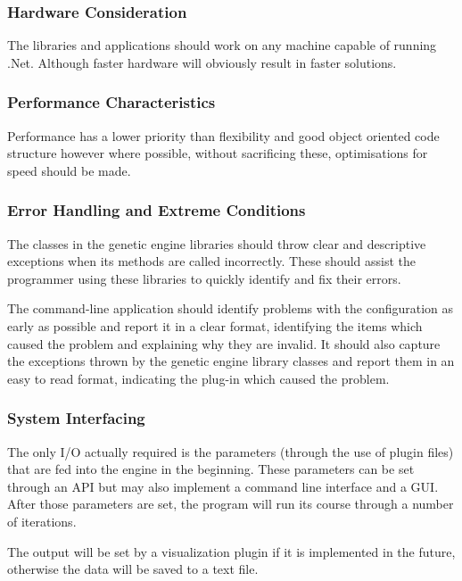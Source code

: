 \subsubsection{Hardware Consideration}
The libraries and applications should work on any machine capable of running .Net. Although faster hardware will obviously result in faster solutions.

\subsubsection{Performance Characteristics}
Performance has a lower priority than flexibility and good object oriented code structure however where possible, without sacrificing these, optimisations for speed should be made.

\subsubsection{Error Handling and Extreme Conditions}
The classes in the genetic engine libraries should throw clear and descriptive exceptions when its methods are called incorrectly. These should assist the programmer using these libraries to quickly identify and fix their errors.

The command-line application should identify problems with the configuration as early as possible and report it in a clear format, identifying the items which caused the problem and explaining why they are invalid. It should also capture the exceptions thrown by the genetic engine library classes and report them in an easy to read format, indicating the plug-in which caused the problem.

\subsubsection{System Interfacing}
The only I/O actually required is the parameters (through the use of plugin files) that are fed into the engine in the beginning. These parameters can be set through an API but may also implement a command line interface and a GUI. After those parameters are set, the program will run its course through a number of iterations.

The output will be set by a visualization plugin if it is implemented in the future, otherwise the data will be saved to a text file.

